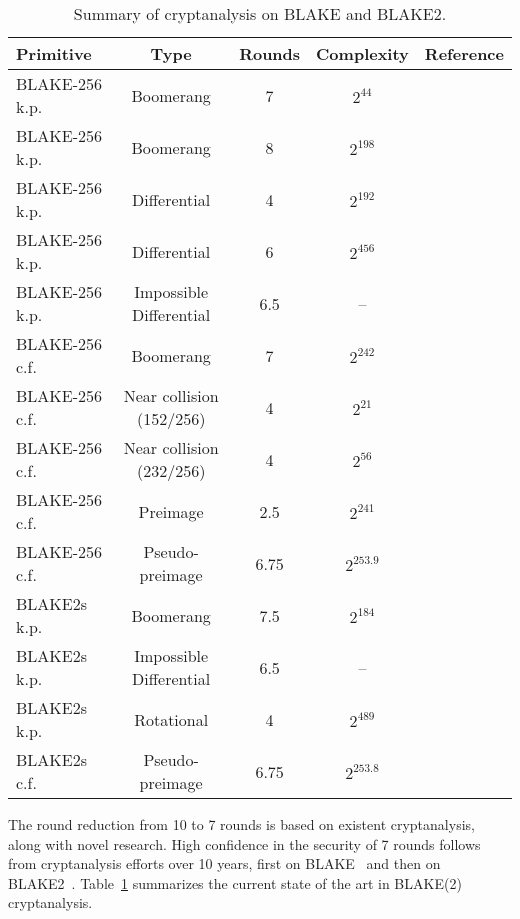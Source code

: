 \documentclass[11pt,notitlepage,a4paper]{article}
\begin{document}
\begin{table}[t]
  \centering
  \caption{Summary of cryptanalysis on BLAKE and BLAKE2.}%
  \label{tab:cryptanalysis}
  \begin{tabular}{lcccc}
    \toprule
    Primitive      & Type         & Rounds & Complexity & Reference \\
    \midrule
    BLAKE-256 k.p. & Boomerang    & 7      & $2^{44}$    & \cite{DBLP:journals/iet-ifs/BaiYWW15,DBLP:conf/cisc/Hao14} \\
    BLAKE-256 k.p. & Boomerang    & 8      & $2^{198}$    & \cite{DBLP:conf/cisc/Hao14} \\
    BLAKE-256 k.p. & Differential & 4      & $2^{192}$    & \cite{DK11} \\
    BLAKE-256 k.p. & Differential & 6      & $2^{456}$    & \cite{DK11} \\
    BLAKE-256 k.p. & Impossible Differential & 6.5      & --    & \cite{DBLP:conf/ctrsa/0001KNWW14} \\
    BLAKE-256 c.f. & Boomerang    & 7      & $2^{242}$    & \cite{DBLP:conf/fse/BiryukovNR11} \\
    BLAKE-256 c.f. & Near collision (152/256) & 4      & $2^{21}$    & \cite{DBLP:conf/cans/SuWWD10} \\
    BLAKE-256 c.f. & Near collision (232/256) & 4      & $2^{56}$    & \cite{DBLP:conf/fse/AumassonGKMM10} \\
    BLAKE-256 c.f. & Preimage & 2.5      & $2^{241}$    & \cite{DBLP:journals/iacr/JiL09} \\
    BLAKE-256 c.f. & Pseudo-preimage & 6.75 & $2^{253.9}$    & \cite{DBLP:conf/crypto/EspitauFK15} \\
    \midrule
    BLAKE2s k.p.   & Boomerang    & 7.5    & $2^{184}$    & \cite{DBLP:conf/cisc/Hao14} \\
    BLAKE2s k.p.   & Impossible Differential & 6.5      & --    & \cite{DBLP:conf/ctrsa/0001KNWW14} \\
    BLAKE2s k.p.   & Rotational   & 4    & $2^{489}$    & \cite{DBLP:conf/ctrsa/0001KNWW14,DBLP:conf/fse/KhovratovichNPS15} \\
    BLAKE2s c.f. & Pseudo-preimage & 6.75 & $2^{253.8}$    & \cite{DBLP:conf/crypto/EspitauFK15} \\
    \bottomrule
  \end{tabular}
\end{table}

The round reduction from 10 to 7 rounds is based on existent cryptanalysis, along with novel research.
High confidence in the security of 7 rounds follows from cryptanalysis
efforts over 10 years, first on
BLAKE~\cite{DBLP:conf/cans/SuWWD10,DBLP:journals/ipl/VidaliNP10,DBLP:journals/iet-ifs/BaiYWW15,DBLP:conf/fse/AumassonGKMM10,DBLP:journals/iacr/JiL09,DK11,DBLP:conf/fse/BiryukovNR11}
and then on BLAKE2~\cite{DBLP:conf/ctrsa/0001KNWW14,DBLP:conf/cisc/Hao14,DBLP:conf/crypto/EspitauFK15}. Table~\ref{tab:cryptanalysis} summarizes the current state of the art in BLAKE(2) cryptanalysis.
\end{document}
